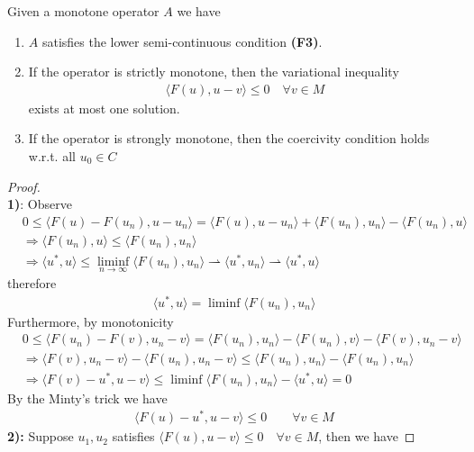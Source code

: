 \begin{lemma}
	Given a monotone operator $A$ we have
	\begin{enumerate}
		\item $A$ satisfies the lower semi-continuous condition \textbf{(F3)}.  
		\item If the operator is strictly monotone, then the variational inequality
				\begin{align*}
			\langle F(u), u - v \rangle \le 0 \quad \forall v \in M
		\end{align*}
		exists at most one solution. 
		\item If the operator is strongly monotone, then the coercivity condition holds w.r.t. all $u_0 \in C$
	\end{enumerate}
\end{lemma}
\begin{proof}
\quad\\
\textbf{1)}: Observe
\begin{align*}
	&0 \le \langle F(u) - F(u_n), u - u_n \rangle = \langle F(u), u - u_n \rangle + \langle F(u_n), u_n \rangle - \langle F(u_n), u \rangle \\
	&\Rightarrow \langle F(u_n) , u \rangle \le \langle F(u_n), u_n \rangle \\
	&\Rightarrow \langle u^*, u \rangle \le \liminf_{n \rightarrow \infty} \langle F(u_n), u_n \rangle \rightharpoonup \langle u^*, u_n \rangle \rightharpoonup \langle u^*, u \rangle 
\end{align*}
therefore
\begin{align*}
	\langle u^*, u \rangle = \liminf \langle F(u_n), u_n \rangle 
\end{align*}
Furthermore, by monotonicity
\begin{align*}
	&0 \le \langle F(u_n) - F(v), u_n - v \rangle = \langle F(u_n), u_n \rangle - \langle F(u_n), v \rangle  - \langle F(v), u_n - v \rangle\\
	&\Rightarrow
	\langle F(v), u_n - v \rangle - \langle F(u_n), u_n - v\rangle \le \langle F(u_n), u_n \rangle - \langle F(u_n), u_n \rangle\\
	&\Rightarrow 
	\langle F(v) - u^*,  u - v \rangle \le \liminf \langle F(u_n), u_n \rangle - \langle u^*, u \rangle  = 0
\end{align*}
By the Minty's trick we have
\begin{align*}
	\langle F(u) - u^*, u - v \rangle \le 0 \qquad \forall v \in M
\end{align*}
\textbf{2):} Suppose $u_1, u_2$ satisfies $\langle F(u), u - v \rangle \le 0 \quad \forall v \in M$, then  we have

\end{proof}
